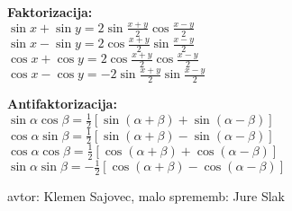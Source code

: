 \documentclass[10pt,a4paper]{amsart}
\theoremstyle{definition} %
\theoremstyle{plain} %
\newcommand{\dx}{\ensuremath{\,\mathrm{d}x}}
\newcommand{\dt}{\ensuremath{\,\mathrm{d}t}}
\let\oldint\int
\renewcommand{\int}{\oldint \!}
\begin{document}
\vspace{1ex}

\parbox{0.4\textwidth}{
\textbf{Faktorizacija:} \\
$\sin{x} + \sin{y} = 2\sin\frac{x+y}{2}\cos\frac{x-y}{2}$\\
$\sin{x} - \sin{y} = 2\cos\frac{x+y}{2}\sin\frac{x-y}{2}$\\
$\cos{x} + \cos{y} = 2\cos\frac{x+y}{2}\cos\frac{x-y}{2}$\\
$\cos{x} - \cos{y} =-2\sin\frac{x+y}{2}\sin\frac{x-y}{2}$
}
\parbox{0.4\textwidth}{
\textbf{Antifaktorizacija:} \\
$\sin\alpha\cos\beta = \frac{1}{2}\left[\sin(\alpha+\beta)+\sin(\alpha-\beta) \right]  $ \\
$\cos\alpha\sin\beta = \frac{1}{2}\left[\sin(\alpha+\beta)-\sin(\alpha-\beta) \right]  $ \\
$\cos\alpha\cos\beta = \frac{1}{2}\left[\cos(\alpha+\beta)+\cos(\alpha-\beta) \right]  $ \\
$\sin\alpha\sin\beta = -\frac{1}{2}\left[\cos(\alpha+\beta)-\cos(\alpha-\beta)  \right]$ \\
}

%
%
%
%
%

\vfill
\hfill avtor: Klemen Sajovec, malo sprememb: Jure Slak
\end{document}
